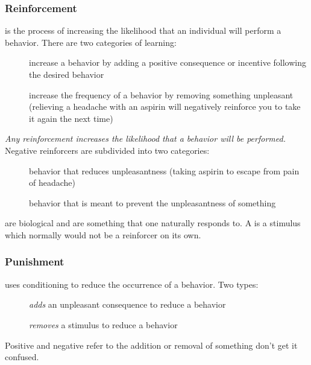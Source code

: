 \documentclass[../Psych_Soci_review.tex]{subfiles}
\begin{document}
\subsubsection{Reinforcement\supdag}

 is the process of increasing the likelihood that an
individual will perform a behavior. There are two categories of learning:
\begin{description}
  \item[] increase a behavior by adding a positive
    consequence or incentive following the desired behavior
  \item[] increase the frequency of a behavior by
    removing something unpleasant (relieving a headache with an aspirin will
    negatively reinforce you to take it again the next time)
\end{description}
\emph{Any reinforcement increases the likelihood that a behavior will be
performed.} Negative reinforcers are subdivided into two categories:
\begin{description}
  \item[] behavior that reduces unpleasantness (taking
    aspirin to escape from pain of headache)
  \item[] behavior that is meant to prevent the
    unpleasantness of something
\end{description}
 are biological and are something that one naturally
responds to. A  is a
stimulus which normally would not be a reinforcer on its own.

\subsubsection{Punishment\supdag}

 uses conditioning to reduce the occurrence of a behavior.
Two types:
\begin{description}
  \item[] \emph{adds} an unpleasant consequence to
    reduce a behavior
  \item[] \emph{removes} a stimulus to reduce a
    behavior
\end{description}
Positive and negative refer to the addition or removal of something don't get it
confused.
\end{document}

